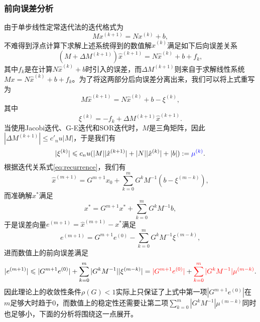\documentclass[a4paper,10pt]{ctexart}
\begin{document}
\subsubsection{前向误差分析}

由于单步线性定常迭代法的迭代格式为
\[
    Mx^{(k+1)} = Nx^{(k)} + b,
\]
不难得到浮点计算下求解上述系统得到的数值解$ \hat{x}^{(k)} $满足如下后向误差关系
\begin{equation}
    (M+\Delta M^{(k+1)})\hat{x}^{(k+1)} = N\hat{x}^{(k)} + b + f_k,
\end{equation}
其中$ f_k $是在计算$ N\hat{x}^{(k)}+b $时引入的误差，而$ \Delta M^{(k+1)} $则来自于求解线性系统$ M x = N\hat{x}^{(k)} + b + f_k $。为了将这两部分后向误差分离出来，我们可以将上式重写为
\begin{equation}\label{eq:recurrence}
    M \hat{x}^{(k+1)} = N\hat{x}^{(k)} + b - \xi^{(k)},
\end{equation}
其中
\[
    \xi^{(k)} = -f_k + \Delta M^{(k+1)}\hat{x}^{(k+1)}.
\]
当使用Jacobi迭代、G-E迭代和SOR迭代时，$ M $是三角矩阵，因此$ |\Delta M^{(k+1)}|\leqslant c'_n u |M| $，于是我们有
\begin{equation}
    |\xi^{(k)}|\leqslant c_n u (|M| |\hat{x}^{(k+1)}| + |N| |\hat{x}^{(k)}| + |b|) :=\textcolor{blue}{\mu^{(k)}}.
\end{equation}
根据迭代关系式\eqref{eq:recurrence}，我们有
\begin{equation}
    \hat{x}^{(m+1)} = G^{m+1}x_0 + \sum_{k=0}^m G^k M^{-1}(b - \xi^{(m-k)}),
\end{equation}
而准确解$ x^* $满足
\[
    x^* = G^{m+1}x^* + \sum_{k=0}^m G^k M^{-1}b,
\]
于是误差向量$ e^{(m+1)} = \hat{x}^{(m+1)} - x^* $满足
\begin{equation}
    e^{(m+1)} = G^{m+1}e^{(0)} - \sum_{k=0}^m G^k M^{-1}\xi^{(m-k)},
\end{equation}
进而数值上的前向误差满足
\begin{equation}
    |e^{(m+1)}|\leqslant |G^{m+1}e^{(0)}| + \sum_{k=0}^m |G^k M^{-1}||\xi^{(m-k)}| = \textcolor{red}{|G^{m+1}e^{(0)}|} + \textcolor{red}{\sum_{k=0}^m |G^k M^{-1}|\mu^{(m-k)}}.
\end{equation}
因此理论上的收敛性条件$ \rho(G)<1 $实际上只保证了上式中第一项$ |G^{m+1}e^{(0)} |$在$ m $足够大时趋于0，而数值上的稳定性还需要让第二项$ \sum_{k=0}^m |G^k M^{-1}|\mu^{(m-k)} $同时也足够小，下面的分析将围绕这一点展开。
\end{document}
